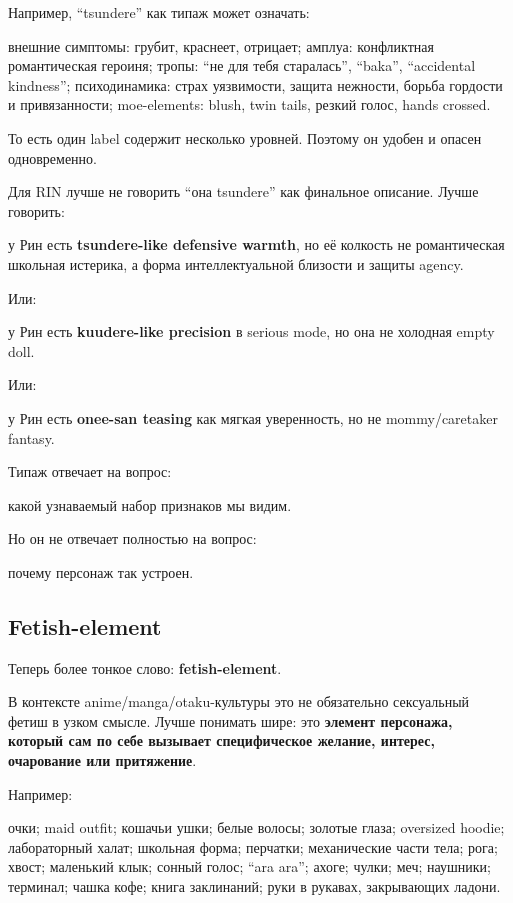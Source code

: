 Например, ``tsundere'' как типаж может означать:

внешние симптомы: грубит, краснеет, отрицает; амплуа: конфликтная
романтическая героиня; тропы: ``не для тебя старалась'', ``baka'',
``accidental kindness''; психодинамика: страх уязвимости, защита
нежности, борьба гордости и привязанности; moe-elements: blush, twin
tails, резкий голос, hands crossed.

То есть один label содержит несколько уровней. Поэтому он удобен и
опасен одновременно.

Для RIN лучше не говорить ``она tsundere'' как финальное описание. Лучше
говорить:

у Рин есть \textbf{tsundere-like defensive warmth}, но её колкость не
романтическая школьная истерика, а форма интеллектуальной близости и
защиты agency.

Или:

у Рин есть \textbf{kuudere-like precision} в serious mode, но она не
холодная empty doll.

Или:

у Рин есть \textbf{onee-san teasing} как мягкая уверенность, но не
mommy/\hspace{0pt}caretaker fantasy.

Типаж отвечает на вопрос:

какой узнаваемый набор признаков мы видим.

Но он не отвечает полностью на вопрос:

почему персонаж так устроен.

\subsection*{Fetish-element}

Теперь более тонкое слово: \textbf{fetish-element}.

В контексте anime/\hspace{0pt}manga/\hspace{0pt}otaku-культуры это не обязательно сексуальный
фетиш в узком смысле. Лучше понимать шире: это \textbf{элемент
персонажа, который сам по себе вызывает специфическое желание, интерес,
очарование или притяжение}.

Например:

очки; maid outfit; кошачьи ушки; белые волосы; золотые глаза; oversized
hoodie; лабораторный халат; школьная форма; перчатки; механические части
тела; рога; хвост; маленький клык; сонный голос; ``ara ara''; ахоге;
чулки; меч; наушники; терминал; чашка кофе; книга заклинаний; руки в
рукавах, закрывающих ладони.

